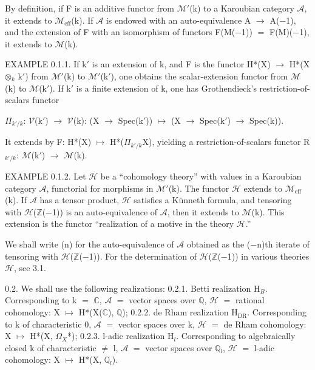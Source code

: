 \documentclass[10pt,twoside]{article}
\begin{document}
By definition, if F is an additive functor from \ensuremath{ℳ}\ensuremath{′}(k) to a Karoubian category \ensuremath{𝒜}, it extends to \ensuremath{ℳ}\ensuremath{_{\mathrm{eff}}}(k). If \ensuremath{𝒜} is endowed with an auto-equivalence A \ensuremath{→} A(\ensuremath{−}1), and the extension of F with an isomorphism of functors F(M(\ensuremath{−}1)) \ensuremath{=} F(M)(\ensuremath{−}1), it extends to \ensuremath{ℳ}(k).\par
EXAMPLE 0.1.1. If k\ensuremath{′} is an extension of k, and F is the functor H*(X) \ensuremath{→} H*(X \ensuremath{⊗}\ensuremath{_{k}} k\ensuremath{′}) from \ensuremath{ℳ}\ensuremath{′}(k) to \ensuremath{ℳ}\ensuremath{′}(k\ensuremath{′}), one obtains the scalar-extension functor from \ensuremath{ℳ}(k) to \ensuremath{ℳ}(k\ensuremath{′}). If k\ensuremath{′} is a finite extension of k, one has Grothendieck’s restriction-of-scalars functor\par
\ensuremath{Π}\ensuremath{_{k′/k}}: \ensuremath{𝒱}(k\ensuremath{′}) \ensuremath{→} \ensuremath{𝒱}(k): (X \ensuremath{→} Spec(k\ensuremath{′})) \ensuremath{↦} (X \ensuremath{→} Spec(k\ensuremath{′}) \ensuremath{→} Spec(k)).\par
It extends by F: H*(X) \ensuremath{↦} H*(\ensuremath{Π}\ensuremath{_{k′/k}}X), yielding a restriction-of-scalars functor R\ensuremath{_{k′/k}}: \ensuremath{ℳ}(k\ensuremath{′}) \ensuremath{→} \ensuremath{ℳ}(k).\par
EXAMPLE 0.1.2. Let \ensuremath{ℋ} be a “cohomology theory” with values in a Karoubian category \ensuremath{𝒜}, functorial for morphisms in \ensuremath{ℳ}\ensuremath{′}(k). The functor \ensuremath{ℋ} extends to \ensuremath{ℳ}\ensuremath{_{\mathrm{eff}}}(k). If \ensuremath{𝒜} has a tensor product, \ensuremath{ℋ} satisfies a Künneth formula, and tensoring with \ensuremath{ℋ}(\ensuremath{ℤ}(\ensuremath{−}1)) is an auto-equivalence of \ensuremath{𝒜}, then it extends to \ensuremath{ℳ}(k). This extension is the functor “realization of a motive in the theory \ensuremath{ℋ}.”\par
We shall write (n) for the auto-equivalence of \ensuremath{𝒜} obtained as the (\ensuremath{−}n)th iterate of tensoring with \ensuremath{ℋ}(\ensuremath{ℤ}(\ensuremath{−}1)). For the determination of \ensuremath{ℋ}(\ensuremath{ℤ}(\ensuremath{−}1)) in various theories \ensuremath{ℋ}, see 3.1.\par
0.2. We shall use the following realizations: 0.2.1. Betti realization H\ensuremath{_{B}}. Corresponding to k \ensuremath{=} \ensuremath{ℂ}, \ensuremath{𝒜} \ensuremath{=} vector spaces over \ensuremath{ℚ}, \ensuremath{ℋ} \ensuremath{=} rational cohomology: X \ensuremath{↦} H*(X(\ensuremath{ℂ}), \ensuremath{ℚ}); 0.2.2. de Rham realization H\ensuremath{_{\mathrm{DR}}}. Corresponding to k of characteristic 0, \ensuremath{𝒜} \ensuremath{=} vector spaces over k, \ensuremath{ℋ} \ensuremath{=} de Rham cohomology: X \ensuremath{↦} H*(X, \ensuremath{Ω}\ensuremath{_{X}}*); 0.2.3. l-adic realization H\ensuremath{_{l}}. Corresponding to algebraically closed k of characteristic \ensuremath{≠} l, \ensuremath{𝒜} \ensuremath{=} vector spaces over \ensuremath{ℚ}\ensuremath{_{l}}, \ensuremath{ℋ} \ensuremath{=} l-adic cohomology: X \ensuremath{↦} H*(X, \ensuremath{ℚ}\ensuremath{_{l}}).\par
\end{document}

